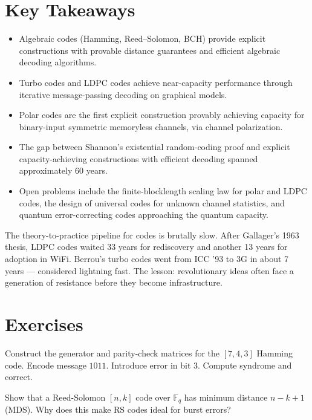 \section*{Key Takeaways}
\begin{itemize}
\item Algebraic codes (Hamming, Reed--Solomon, BCH) provide explicit constructions with provable distance guarantees and efficient algebraic decoding algorithms.
\item Turbo codes and LDPC codes achieve near-capacity performance through iterative message-passing decoding on graphical models.
\item Polar codes are the first explicit construction provably achieving capacity for binary-input symmetric memoryless channels, via channel polarization.
\item The gap between Shannon's existential random-coding proof and explicit capacity-achieving constructions with efficient decoding spanned approximately 60 years.
\item Open problems include the finite-blocklength scaling law for polar and LDPC codes, the design of universal codes for unknown channel statistics, and quantum error-correcting codes approaching the quantum capacity.
\end{itemize}

The theory-to-practice pipeline for codes is brutally slow. After Gallager's 1963 thesis, LDPC codes waited 33 years for rediscovery and another 13 years for adoption in WiFi. Berrou's turbo codes went from ICC '93 to 3G in about 7 years --- considered lightning fast. The lesson: revolutionary ideas often face a generation of resistance before they become infrastructure.

\section{Exercises}
\label{sec:ec:exercises}

\begin{exercise}[Basic]
Construct the generator and parity-check matrices for the $[7,4,3]$ Hamming code. Encode message $1011$. Introduce error in bit 3. Compute syndrome and correct.
\end{exercise}

\begin{exercise}[Basic]
Show that a Reed-Solomon $[n,k]$ code over $\mathbb{F}_q$ has minimum distance $n-k+1$ (MDS). Why does this make RS codes ideal for burst errors?
\end{exercise}

